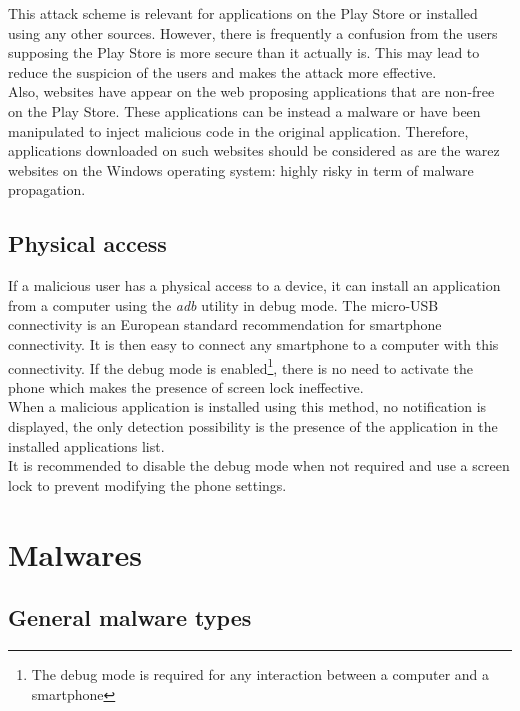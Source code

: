 This attack scheme is relevant for applications on the Play Store or installed using any other sources.
However, there is frequently a confusion from the users supposing the Play Store is more secure than it actually is.
This may lead to reduce the suspicion of the users and makes the attack more effective.\\

Also, websites have appear on the web proposing applications that are non-free on the Play Store.
These applications can be instead a malware or have been manipulated to inject malicious code in the original application.
Therefore, applications downloaded on such websites should be considered as are the warez websites on the Windows operating system: highly risky in term of malware propagation.

\subsection{Physical access}

If a malicious user has a physical access to a device, it can install an application from a computer using the \emph{adb} utility in debug mode.
The micro-USB connectivity is an European standard recommendation for smartphone connectivity.
It is then easy to connect any smartphone to a computer with this connectivity.
If the debug mode is enabled\footnote{The debug mode is required for any interaction between a computer and a smartphone}, there is no need to activate the phone which makes the presence of screen lock ineffective.\\

When a malicious application is installed using this method, no notification is displayed, the only detection possibility is the presence of the application in the installed applications list.\\

It is recommended to disable the debug mode when not required and use a screen lock to prevent modifying the phone settings.

\section{Malwares}

\subsection{General malware types}
\label{sec:malware-type}

